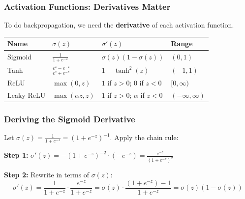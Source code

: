\documentclass[notes,11pt, aspectratio=169]{beamer}
\begin{document}
\begin{frame}
\frametitle{Activation Functions: Derivatives Matter}

To do backpropagation, we need the \textbf{derivative} of each activation function.

\vspace{4pt}
\renewcommand{\arraystretch}{1.6}
\begin{center}
{\small
\begin{tabular}{llll}
\toprule
\textbf{Name} & \textbf{$\sigma(z)$} & \textbf{$\sigma'(z)$} & \textbf{Range} \\
\midrule
Sigmoid & $\frac{1}{1+e^{-z}}$ & $\sigma(z)(1 - \sigma(z))$ & $(0, 1)$ \\[3pt]
Tanh & $\frac{e^z - e^{-z}}{e^z + e^{-z}}$ & $1 - \tanh^2(z)$ & $(-1, 1)$ \\[3pt]
ReLU & $\max(0, z)$ & $1$ if $z > 0$; $0$ if $z < 0$ & $[0, \infty)$ \\[3pt]
Leaky ReLU & $\max(\alpha z, z)$ & $1$ if $z > 0$; $\alpha$ if $z < 0$ & $(-\infty, \infty)$ \\
\bottomrule
\end{tabular}
}
\end{center}
\end{frame}

\begin{frame}
\frametitle{Deriving the Sigmoid Derivative}

Let $\sigma(z) = \frac{1}{1 + e^{-z}} = (1 + e^{-z})^{-1}$. Apply the chain rule:

\vspace{2pt}
\textbf{Step 1:}
$\sigma'(z) = -(1 + e^{-z})^{-2} \cdot (-e^{-z}) = \frac{e^{-z}}{(1 + e^{-z})^2}$

\vspace{4pt}
\textbf{Step 2:} Rewrite in terms of $\sigma(z)$:
\[
    \sigma'(z) = \frac{1}{1+e^{-z}} \cdot \frac{e^{-z}}{1+e^{-z}} = \sigma(z) \cdot \frac{(1 + e^{-z}) - 1}{1+e^{-z}} = \sigma(z)(1 - \sigma(z))
\]

\end{frame}
\end{document}
